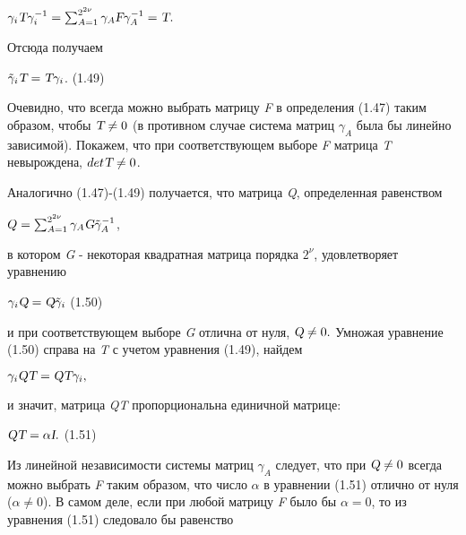 \documentclass{article}
\begin{document}
{\begin{center}
$\gamma_{i}\textsl{T}\gamma^{-1}_{i}=\sum_{A=1}^{2^{2\nu}}\gamma_{A}\textsl{F}\gamma^{-1}_{A}=\textsl{T}.$\par
\end{center}
Отсюда получаем\par
\begin{center}
$\tilde\gamma_{i}\textsl{T}=\textsl{T}\gamma_{i}$.      (1.49)\par
\end{center}
Очевидно, что всегда можно выбрать матрицу \textsl{F} в определения (1.47) таким образом, чтобы $\textsl{T}\ne0$ (в противном случае система матриц $\gamma_{A}$ была бы линейно зависимой). Покажем, что при соответствующем выборе \textsl{F} матрица \textsl{T} невырождена, $det\textsl{T}\ne0$.\par
Аналогично (1.47)-(1.49) получается, что матрица \textsl{Q}, определенная равенством\par
\begin{center}
$Q=\sum_{A=1}^{2^{2\nu}}\gamma_{A}\textsl{G}\tilde\gamma_{A}^{-1}$,\par
\end{center}
в котором \textsl{G} - некоторая квадратная матрица порядка $2^{\nu}$, удовлетворяет уравнению\par
\begin{center}
$\gamma_{i}\textsl{Q}=\textsl{Q}\tilde\gamma_{i}$       (1.50)\par
\end{center}
и при соответствующем выборе \textsl{G} отлична от нуля, $\textsl{Q}\ne0.$ Умножая уравнение (1.50) справа на \textsl{T}  с учетом уравнения (1.49), найдем\par
\begin{center}
$\gamma_{i}\textsl{QT}=\textsl{QT}\gamma_{i},$\par
\end{center}
и значит, матрица \textsl{QT} пропорциональна единичной матрице:\par
\begin{center}
$\textsl{QT}=\alpha\textsl{I}.$       (1.51) \par
\end{center}
Из линейной независимости системы матриц $\gamma_{A}$ следует, что при $\textsl{Q}\ne0$ всегда можно выбрать \textsl{F} таким образом, что число $\alpha$  в уравнении (1.51) отлично от нуля ($\alpha\ne0$). В самом деле, если при любой матрицу \textsl{F} было бы $\alpha=0$, то из уравнения (1.51) следовало бы равенство\par
\begin{center}

\end{center}}
\end{document}
